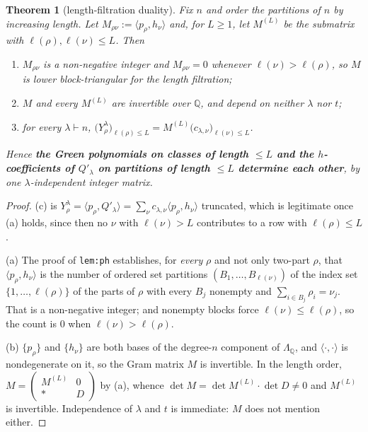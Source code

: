 \documentclass[11pt]{article}
\newtheorem{theorem}{Theorem}
\theoremstyle{definition}
\newcommand{\lam}{\lambda}
\newcommand{\Qp}{Q'}
\newcommand{\QQ}{\mathbb{Q}}
\begin{document}
\begin{theorem}[length-filtration duality]\label{thm:filt}
Fix $n$ and order the partitions of $n$ by increasing length. Let
$M_{\rho\nu}:=\langle p_\rho,h_\nu\rangle$ and, for $L\ge1$, let $M^{(L)}$ be the submatrix with
$\ell(\rho),\ell(\nu)\le L$. Then
\begin{enumerate}[label=(\alph*)]
\item $M_{\rho\nu}$ is a non-negative integer and $M_{\rho\nu}=0$ whenever $\ell(\nu)>\ell(\rho)$,
so $M$ is lower block-triangular for the length filtration;
\item $M$ and every $M^{(L)}$ are invertible over $\QQ$, and depend on neither $\lam$ nor $t$;
\item for every $\lam\vdash n$,
$\bigl(Y^{\lam}_{\rho}\bigr)_{\ell(\rho)\le L}=M^{(L)}\bigl(c_{\lam,\nu}\bigr)_{\ell(\nu)\le L}$.
\end{enumerate}
Hence \textbf{the Green polynomials on classes of length $\le L$ and the $h$-coefficients of
$\Qp_\lam$ on partitions of length $\le L$ determine each other}, by one $\lam$-independent integer
matrix.
\end{theorem}
\begin{proof}
(c) is $Y^\lam_\rho=\langle p_\rho,\Qp_\lam\rangle=\sum_\nu c_{\lam,\nu}\langle p_\rho,h_\nu\rangle$
truncated, which is legitimate once (a) holds, since then no $\nu$ with $\ell(\nu)>L$ contributes to
a row with $\ell(\rho)\le L$.

(a) The proof of \texttt{lem:ph} establishes, for \emph{every} $\rho$ and not only two-part $\rho$,
that $\langle p_\rho,h_\nu\rangle$ is the number of ordered set partitions
$(B_1,\dots,B_{\ell(\nu)})$ of the index set $\{1,\dots,\ell(\rho)\}$ of the parts of $\rho$ with
every $B_j$ nonempty and $\sum_{i\in B_j}\rho_i=\nu_j$. That is a non-negative integer; and
nonempty blocks force $\ell(\nu)\le\ell(\rho)$, so the count is $0$ when $\ell(\nu)>\ell(\rho)$.

(b) $\{p_\rho\}$ and $\{h_\nu\}$ are both bases of the degree-$n$ component of
$\Lambda_\QQ$, and $\langle\cdot,\cdot\rangle$ is nondegenerate on it, so the Gram matrix $M$ is
invertible. In the length order, $M=\begin{pmatrix}M^{(L)}&0\\ \ast&D\end{pmatrix}$ by (a), whence
$\det M=\det M^{(L)}\cdot\det D\ne0$ and $M^{(L)}$ is invertible. Independence of $\lam$ and $t$ is
immediate: $M$ does not mention either.
\end{proof}
\end{document}
